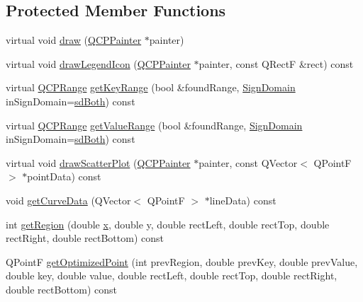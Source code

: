 \subsection*{Protected Member Functions}
\begin{DoxyCompactItemize}
\item 
virtual void \hyperlink{classQCPCurve_a2361302d2fc6ec669849bd3bca00c4b2}{draw} (\hyperlink{classQCPPainter}{Q\+C\+P\+Painter} $\ast$painter)
\item 
virtual void \hyperlink{classQCPCurve_aaee24451e0044d1debfa1fee92c58d7b}{draw\+Legend\+Icon} (\hyperlink{classQCPPainter}{Q\+C\+P\+Painter} $\ast$painter, const Q\+RectF \&rect) const 
\item 
virtual \hyperlink{classQCPRange}{Q\+C\+P\+Range} \hyperlink{classQCPCurve_ad6a9559e16ab43586df18ae376d54481}{get\+Key\+Range} (bool \&found\+Range, \hyperlink{classQCPAbstractPlottable_a661743478a1d3c09d28ec2711d7653d8}{Sign\+Domain} in\+Sign\+Domain=\hyperlink{classQCPAbstractPlottable_a661743478a1d3c09d28ec2711d7653d8a082b98cfb91a7363a3b5cd17b0c1cd60}{sd\+Both}) const 
\item 
virtual \hyperlink{classQCPRange}{Q\+C\+P\+Range} \hyperlink{classQCPCurve_a1d6eec81aab9ae6182bb7c040bcb2dbc}{get\+Value\+Range} (bool \&found\+Range, \hyperlink{classQCPAbstractPlottable_a661743478a1d3c09d28ec2711d7653d8}{Sign\+Domain} in\+Sign\+Domain=\hyperlink{classQCPAbstractPlottable_a661743478a1d3c09d28ec2711d7653d8a082b98cfb91a7363a3b5cd17b0c1cd60}{sd\+Both}) const 
\item 
virtual void \hyperlink{classQCPCurve_a45593f30b81beec4b6130b6b53306087}{draw\+Scatter\+Plot} (\hyperlink{classQCPPainter}{Q\+C\+P\+Painter} $\ast$painter, const Q\+Vector$<$ Q\+PointF $>$ $\ast$point\+Data) const 
\item 
void \hyperlink{classQCPCurve_afa895f8ba9ae34fea6ecea295fd7b1e5}{get\+Curve\+Data} (Q\+Vector$<$ Q\+PointF $>$ $\ast$line\+Data) const 
\item 
int \hyperlink{classQCPCurve_a3af3183f35bd7aebe149f29ae4f1034a}{get\+Region} (double \hyperlink{qualification__task_8cpp_a6150e0515f7202e2fb518f7206ed97dc}{x}, double y, double rect\+Left, double rect\+Top, double rect\+Right, double rect\+Bottom) const 
\item 
Q\+PointF \hyperlink{classQCPCurve_acbcfea8986dde6c0143e3f7e8e76041d}{get\+Optimized\+Point} (int prev\+Region, double prev\+Key, double prev\+Value, double key, double value, double rect\+Left, double rect\+Top, double rect\+Right, double rect\+Bottom) const 
\item 

\end{DoxyCompactItemize}
